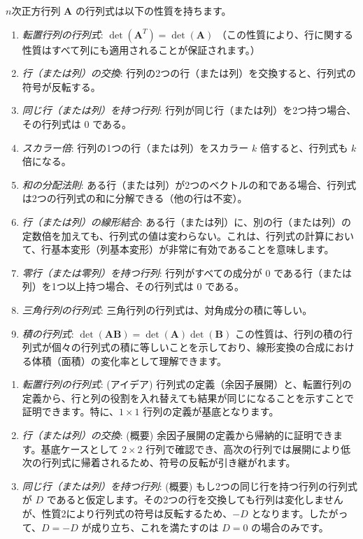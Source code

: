 \begin{thm}[行列式の性質]
$n$次正方行列 $\bm{A}$ の行列式は以下の性質を持ちます。
\begin{enumerate}
    \item \emph{転置行列の行列式}: $\det(\bm{A}^T) = \det(\bm{A})$
    （この性質により、行に関する性質はすべて列にも適用されることが保証されます。）
    \item \emph{行（または列）の交換}: 行列の2つの行（または列）を交換すると、行列式の符号が反転する。
    \item \emph{同じ行（または列）を持つ行列}: 行列が同じ行（または列）を2つ持つ場合、その行列式は $0$ である。
    \item \emph{スカラー倍}: 行列の1つの行（または列）をスカラー $k$ 倍すると、行列式も $k$ 倍になる。
    \item \emph{和の分配法則}: ある行（または列）が2つのベクトルの和である場合、行列式は2つの行列式の和に分解できる（他の行は不変）。
    \item \emph{行（または列）の線形結合}: ある行（または列）に、別の行（または列）の定数倍を加えても、行列式の値は変わらない。これは、行列式の計算において、行基本変形（列基本変形）が非常に有効であることを意味します。
    \item \emph{零行（または零列）を持つ行列}: 行列がすべての成分が $0$ である行（または列）を1つ以上持つ場合、その行列式は $0$ である。
    \item \emph{三角行列の行列式}: 三角行列の行列式は、対角成分の積に等しい。
    \item \emph{積の行列式}: $\det(\bm{A}\bm{B}) = \det(\bm{A})\det(\bm{B})$
    この性質は、行列の積の行列式が個々の行列式の積に等しいことを示しており、線形変換の合成における体積（面積）の変化率として理解できます。
\end{enumerate}
\begin{proof*}
\begin{enumerate}
    \item \emph{転置行列の行列式}: (アイデア)
    行列式の定義（余因子展開）と、転置行列の定義から、行と列の役割を入れ替えても結果が同じになることを示すことで証明できます。特に、$1 \times 1$ 行列の定義が基底となります。
    \item \emph{行（または列）の交換}: (概要)
    余因子展開の定義から帰納的に証明できます。基底ケースとして $2 \times 2$ 行列で確認でき、高次の行列では展開により低次の行列式に帰着されるため、符号の反転が引き継がれます。
    \item \emph{同じ行（または列）を持つ行列}: (概要)
    もし2つの同じ行を持つ行列の行列式が $D$ であると仮定します。その2つの行を交換しても行列は変化しませんが、性質2により行列式の符号は反転するため、$-D$ となります。したがって、$D = -D$ が成り立ち、これを満たすのは $D=0$ の場合のみです。

\end{enumerate}
\end{proof*}
\end{thm}
